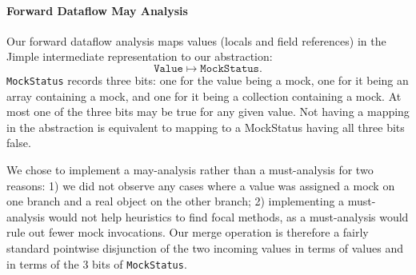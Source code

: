 \paragraph{Forward Dataflow May Analysis}

Our forward dataflow analysis maps values (locals and field references) in the Jimple intermediate representation to our abstraction:
\[ \mathtt{Value} \mapsto \mathtt{MockStatus}. \]
\texttt{MockStatus} records three bits: one for the value being a mock, one for it being an array containing a mock, and one for it being a collection containing a mock. At most one of the three bits may be true for any given value. Not having a mapping in the abstraction is equivalent to mapping to a MockStatus having all three bits false. 

We chose to implement a may-analysis rather than a must-analysis for two reasons: 1) we did not observe any cases where a value was assigned a mock on one branch and a real object on the other branch; 2) implementing a must-analysis would not help heuristics to find focal methods, as a must-analysis would rule out fewer mock invocations. Our merge operation is therefore a fairly standard pointwise disjunction of the two incoming values in terms of values and in terms of the 3 bits of \texttt{MockStatus}.



